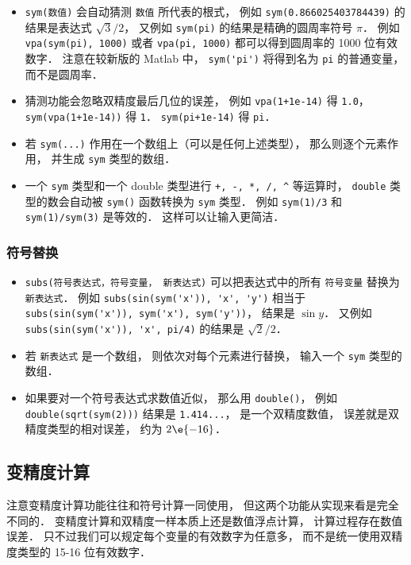 \begin{itemize}
\item  \verb|sym(数值)| 会自动猜测 \verb|数值| 所代表的根式， 例如 \verb|sym(0.866025403784439)| 的结果是表达式 $\sqrt{3}/2$， 又例如 \verb|sym(pi)| 的结果是精确的圆周率符号 $\pi$． 例如 \verb|vpa(sym(pi), 1000)| 或者 \verb|vpa(pi, 1000)| 都可以得到圆周率的 1000 位有效数字． 注意在较新版的 Matlab 中， \verb|sym('pi')| 将得到名为 \verb|pi| 的普通变量， 而不是圆周率．

\item 猜测功能会忽略双精度最后几位的误差， 例如 \verb|vpa(1+1e-14)| 得 \verb|1.0|， \verb|sym(vpa(1+1e-14))| 得 \verb|1|． \verb|sym(pi+1e-14)| 得 \verb|pi|．

\item 若 \verb|sym(...)| 作用在一个数组上（可以是任何上述类型）， 那么则逐个元素作用， 并生成 \verb|sym| 类型的数组．

\item 一个 \verb|sym| 类型和一个 double 类型进行 \verb|+, -, *, /, ^| 等运算时， \verb|double| 类型的数会自动被 \verb|sym()| 函数转换为 \verb|sym| 类型． 例如 \verb|sym(1)/3| 和 \verb|sym(1)/sym(3)| 是等效的． 这样可以让输入更简洁．
\end{itemize}

\subsubsection{符号替换}
\begin{itemize}
\item \verb|subs(符号表达式，符号变量， 新表达式)| 可以把表达式中的所有 \verb|符号变量| 替换为 \verb|新表达式|． 例如 \verb|subs(sin(sym('x')), 'x', 'y')| 相当于 \verb|subs(sin(sym('x')), sym('x'), sym('y'))|， 结果是 $\sin y$． 又例如 \verb|subs(sin(sym('x')), 'x', pi/4)| 的结果是 $\sqrt 2/2$．
\item 若 \verb|新表达式| 是一个数组， 则依次对每个元素进行替换， 输入一个 \verb|sym| 类型的数组．
\item 如果要对一个符号表达式求数值近似， 那么用 \verb|double()|， 例如 \verb|double(sqrt(sym(2)))| 结果是 \verb|1.414...|， 是一个双精度数值， 误差就是双精度类型的相对误差， 约为 $2\e{-16}$．
\end{itemize}

\subsection{变精度计算}
注意变精度计算功能往往和符号计算一同使用， 但这两个功能从实现来看是完全不同的． 变精度计算和双精度一样本质上还是数值浮点计算， 计算过程存在数值误差． 只不过我们可以规定每个变量的有效数字为任意多， 而不是统一使用双精度类型的 15-16 位有效数字．

